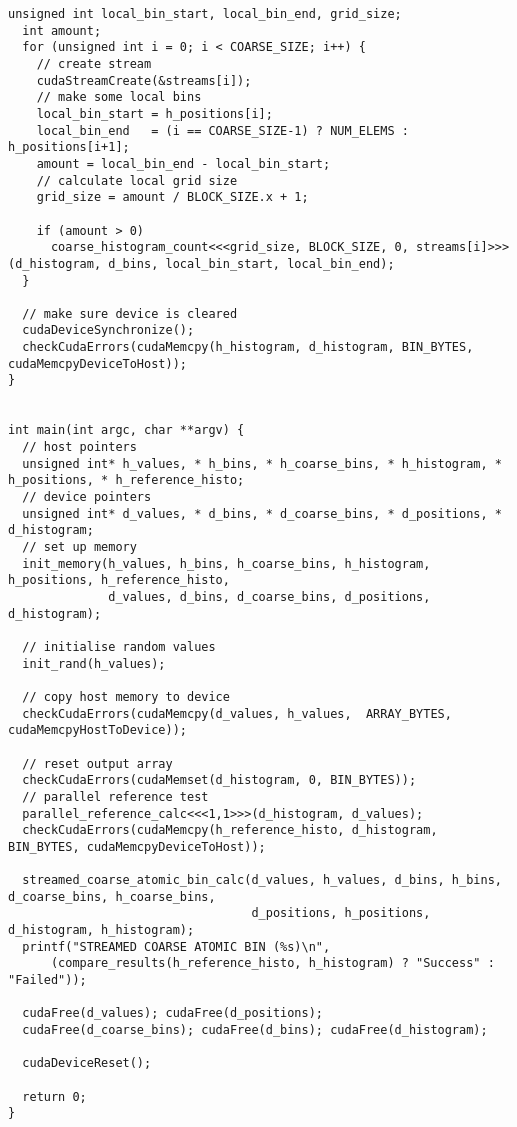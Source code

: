 \begin{lstlisting}[captionpos=t, xleftmargin=0.0pt, xrightmargin=0.0pt, caption={Coarse Histogram implementation}, label={lst:coarse histogram impl}]
  unsigned int local_bin_start, local_bin_end, grid_size;
  int amount;
  for (unsigned int i = 0; i < COARSE_SIZE; i++) {
    // create stream
    cudaStreamCreate(&streams[i]);
    // make some local bins
    local_bin_start = h_positions[i];
    local_bin_end   = (i == COARSE_SIZE-1) ? NUM_ELEMS : h_positions[i+1];
    amount = local_bin_end - local_bin_start;
    // calculate local grid size
    grid_size = amount / BLOCK_SIZE.x + 1;

    if (amount > 0) 
      coarse_histogram_count<<<grid_size, BLOCK_SIZE, 0, streams[i]>>>(d_histogram, d_bins, local_bin_start, local_bin_end);
  }

  // make sure device is cleared
  cudaDeviceSynchronize();
  checkCudaErrors(cudaMemcpy(h_histogram, d_histogram, BIN_BYTES, cudaMemcpyDeviceToHost));
}


int main(int argc, char **argv) {
  // host pointers
  unsigned int* h_values, * h_bins, * h_coarse_bins, * h_histogram, * h_positions, * h_reference_histo;
  // device pointers
  unsigned int* d_values, * d_bins, * d_coarse_bins, * d_positions, * d_histogram;
  // set up memory
  init_memory(h_values, h_bins, h_coarse_bins, h_histogram, h_positions, h_reference_histo,
              d_values, d_bins, d_coarse_bins, d_positions, d_histogram);

  // initialise random values
  init_rand(h_values);

  // copy host memory to device
  checkCudaErrors(cudaMemcpy(d_values, h_values,  ARRAY_BYTES, cudaMemcpyHostToDevice));

  // reset output array
  checkCudaErrors(cudaMemset(d_histogram, 0, BIN_BYTES));
  // parallel reference test
  parallel_reference_calc<<<1,1>>>(d_histogram, d_values);
  checkCudaErrors(cudaMemcpy(h_reference_histo, d_histogram,  BIN_BYTES, cudaMemcpyDeviceToHost));

  streamed_coarse_atomic_bin_calc(d_values, h_values, d_bins, h_bins, d_coarse_bins, h_coarse_bins, 
                                  d_positions, h_positions, d_histogram, h_histogram);
  printf("STREAMED COARSE ATOMIC BIN (%s)\n", 
      (compare_results(h_reference_histo, h_histogram) ? "Success" : "Failed"));

  cudaFree(d_values); cudaFree(d_positions);
  cudaFree(d_coarse_bins); cudaFree(d_bins); cudaFree(d_histogram);

  cudaDeviceReset();

  return 0;
}

\end{lstlisting}
